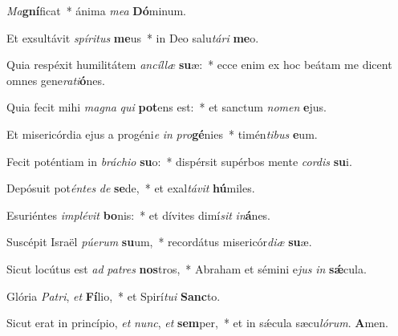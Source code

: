 \item \textit{Ma}\textbf{gní}ficat~* ánima \textit{me}\textit{a} \textbf{Dó}minum.

\item Et exsultávit \textit{spí}\textit{ri}\textit{tus} \textbf{me}us~* in Deo salu\textit{tá}\textit{ri} \textbf{me}o.

\item Quia respéxit humilitátem \textit{an}\textit{cíl}\textit{læ} \textbf{su}æ:~* ecce enim ex hoc beátam me dicent omnes gene\textit{ra}\textit{ti}\textbf{ó}nes.

\item Quia fecit mihi \textit{ma}\textit{gna} \textit{qui} \textbf{pot}ens est:~* et sanctum \textit{no}\textit{men} \textbf{e}jus.

\item Et misericórdia ejus a progéni\textit{e} \textit{in} \textit{pro}\textbf{gé}nies~* timén\textit{ti}\textit{bus} \textbf{e}um.

\item Fecit poténtiam in \textit{brá}\textit{chi}\textit{o} \textbf{su}o:~* dispérsit supérbos mente \textit{cor}\textit{dis} \textbf{su}i.

\item Depósuit pot\textit{én}\textit{tes} \textit{de} \textbf{se}de,~* et exal\textit{tá}\textit{vit} \textbf{hú}miles.

\item Esuriéntes \textit{im}\textit{plé}\textit{vit} \textbf{bo}nis:~* et dívites dimí\textit{sit} \textit{in}\textbf{á}nes.

\item Suscépit Israël \textit{pú}\textit{e}\textit{rum} \textbf{su}um,~* recordátus misericór\textit{di}\textit{æ} \textbf{su}æ.

\item Sicut locútus est \textit{ad} \textit{pa}\textit{tres} \textbf{nos}tros,~* Abraham et sémini e\textit{jus} \textit{in} \textbf{sǽ}cula.

\item Glória \textit{Pa}\textit{tri}, \textit{et} \textbf{Fí}lio,~* et Spirí\textit{tu}\textit{i} \textbf{Sanc}to.

\item Sicut erat in princípio, \textit{et} \textit{nunc}, \textit{et} \textbf{sem}per,~* et in sǽcula sæcu\textit{ló}\textit{rum}. \textbf{A}men.
